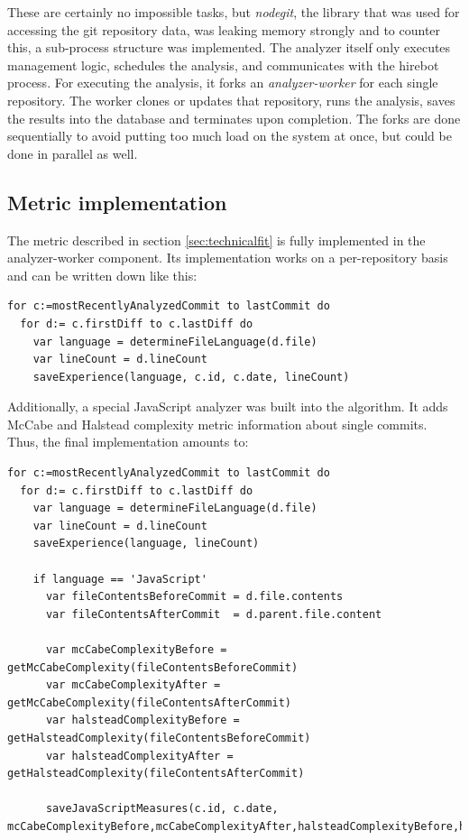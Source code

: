 These are certainly no impossible tasks, but \textit{nodegit}, the library
that was used for accessing the git repository data, was
leaking memory strongly and to counter this, a sub-process structure was
implemented. The analyzer itself only executes management logic,
schedules the analysis, and communicates with the hirebot process.
For executing the analysis, it forks an \textit{analyzer-worker} for each
single repository. The worker clones or updates that repository,
runs the analysis, saves the results into the database and terminates
upon completion. The forks are done sequentially to avoid putting
too much load on the system at once, but could be done in parallel as well.

\subsection{Metric implementation}\label{sec:metric-implementation}
The metric described in section \ref{sec:technicalfit} is fully implemented in the analyzer-worker component. Its implementation works on a per-repository basis and can be written down like this:

\begin{lstlisting}[frame=false]
for c:=mostRecentlyAnalyzedCommit to lastCommit do
  for d:= c.firstDiff to c.lastDiff do
    var language = determineFileLanguage(d.file)
    var lineCount = d.lineCount
    saveExperience(language, c.id, c.date, lineCount)
\end{lstlisting}

Additionally, a special JavaScript analyzer was built into the algorithm.
It adds McCabe and Halstead complexity metric information about single
commits. Thus, the final implementation amounts to:

\begin{minipage}{\linewidth}
\begin{lstlisting}[frame=false]
for c:=mostRecentlyAnalyzedCommit to lastCommit do
  for d:= c.firstDiff to c.lastDiff do
    var language = determineFileLanguage(d.file)
    var lineCount = d.lineCount
    saveExperience(language, lineCount)

    if language == 'JavaScript'
      var fileContentsBeforeCommit = d.file.contents
      var fileContentsAfterCommit  = d.parent.file.content

      var mcCabeComplexityBefore = getMcCabeComplexity(fileContentsBeforeCommit)
      var mcCabeComplexityAfter = getMcCabeComplexity(fileContentsAfterCommit)
      var halsteadComplexityBefore = getHalsteadComplexity(fileContentsBeforeCommit)
      var halsteadComplexityAfter = getHalsteadComplexity(fileContentsAfterCommit)

      saveJavaScriptMeasures(c.id, c.date, mcCabeComplexityBefore,mcCabeComplexityAfter,halsteadComplexityBefore,halsteadComplexityAfter)
\end{lstlisting}
\end{minipage}

